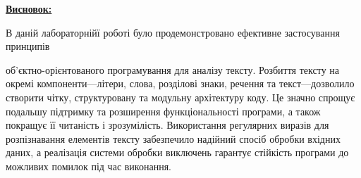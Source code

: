 \documentclass[12pt,a4paper]{article}
\begin{document}
    \vspace{3em}

    \textbf{\underline{Висновок:}}

    \setlength{\parindent}{1.5em}

    \vspace{1em}

    В даній лабораторнійї роботі було продемонстровано ефективне застосування принципів

    \setlength{\parindent}{0pt}
    
    об'єктно-орієнтованого програмування для аналізу тексту. Розбиття тексту на окремі компоненти—літери, слова, розділові знаки, речення та текст—дозволило створити чітку, структуровану та модульну архітектуру коду. Це значно спрощує подальшу підтримку та розширення функціональності програми, а також покращує її читаність і зрозумілість.
    Використання регулярних виразів для розпізнавання елементів тексту забезпечило надійний спосіб обробки вхідних даних, а реалізація системи обробки виключень гарантує стійкість програми до можливих помилок під час виконання.
\end{document}
